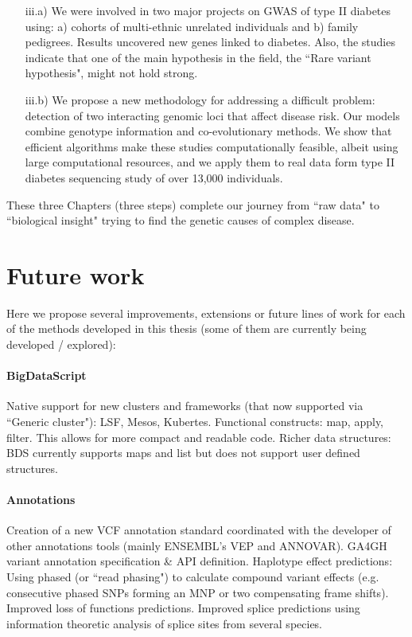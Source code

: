 \begin{itemize}
	\begin{itemize}
	\item[iii.a)] We were involved in two major projects on GWAS of type II diabetes using: a) cohorts of multi-ethnic unrelated individuals and b) family pedigrees. Results uncovered new genes linked to diabetes. Also, the studies indicate that one of the main hypothesis in the field, the ``Rare variant hypothesis", might not hold strong.
	
	\item[iii.b)] We propose a new methodology for addressing a difficult problem: detection of two interacting genomic loci that affect disease risk. Our models combine genotype information and co-evolutionary methods. We show that efficient algorithms make these studies computationally feasible, albeit using large computational resources, and we apply them to real data form type II diabetes sequencing study of over 13,000 individuals.
	\end{itemize}
\end{itemize}

These three Chapters (three steps) complete our journey from ``raw data" to ``biological insight" trying to find the genetic causes of complex disease.

\section{Future work}

Here we propose several improvements, extensions or future lines of work for each of the methods developed in this thesis (some of them are currently being developed / explored): \\

\paragraph{BigDataScript}
Native support for new clusters and frameworks (that now supported via ``Generic cluster"): LSF, Mesos, Kubertes.
Functional constructs: map, apply, filter. This allows for more compact and readable code.
Richer data structures: BDS currently supports maps and list but does not support user defined structures.

\paragraph{Annotations}
Creation of a new VCF annotation standard coordinated with the developer of other annotations tools (mainly ENSEMBL’s VEP and ANNOVAR).
GA4GH variant annotation specification \& API definition.
Haplotype effect predictions: Using phased (or ``read phasing") to calculate compound variant effects (e.g. consecutive phased SNPs forming an MNP or two compensating frame shifts).
Improved loss of functions predictions.
Improved splice predictions using information theoretic analysis of splice sites from several species.


